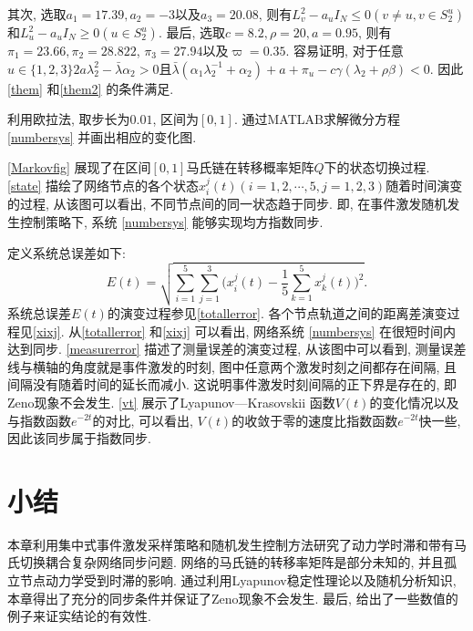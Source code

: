  其次, 选取$a_1=17.39, a_2=-3$以及$a_3=20.08$, 则有$L^2_v-a_uI_N\leq 0(v\neq u, v\in S_2^u)$和$L^2_u-a_uI_N\geq 0(u\in S_2^u)$.
 最后, 选取$c=8.2, \rho=20, a=0.95$, 则有$\pi_1=23.66, \pi_2=28.822$, $\pi_3=27.94$以及$\varpi=0.35$. 容易证明, 对于任意$u\in\{1,2,3\}$$2a\lambda_2^2-\bar{\lambda}\alpha_2>0$且$\bar{\lambda}(\alpha_1\lambda^{-1}_2+\alpha_2)+a+\pi_u-c\gamma(\lambda_2+\rho\beta)<0$. 因此\autoref{them} 和\autoref{them2} 的条件满足.

 利用欧拉法, 取步长为$0.01$, 区间为$[0,1]$. 通过MATLAB求解微分方程 \eqref{numbersys} 并画出相应的变化图.

\autoref{Markovfig} 展现了在区间$[0,1]$马氏链在转移概率矩阵$Q$下的状态切换过程. \autoref{state} 描绘了网络节点的各个状态$x_i^j(t)(i=1,2,\cdots,5, j=1,2,3)$随着时间演变的过程, 从该图可以看出, 不同节点间的同一状态趋于同步. 即, 在事件激发随机发生控制策略下, 系统 \eqref{numbersys} 能够实现均方指数同步.

定义系统总误差如下:
        $$E(t)=\sqrt{\sum_{i=1}^5\sum_{j=1}^3\Big(x_i^j(t)-\frac{1}{5}\sum_{k=1}^5x_k^j(t)\Big)^2}.$$
系统总误差$E(t)$的演变过程参见\autoref{totallerror}. 各个节点轨道之间的距离差演变过程见\autoref{xixj}. 从\autoref{totallerror} 和\autoref{xixj} 可以看出, 网络系统 \eqref{numbersys} 在很短时间内达到同步. \autoref{measurerror} 描述了测量误差的演变过程, 从该图中可以看到, 测量误差线与横轴的角度就是事件激发的时刻, 图中任意两个激发时刻之间都存在间隔, 且间隔没有随着时间的延长而减小. 这说明事件激发时刻间隔的正下界是存在的, 即Zeno现象不会发生. \autoref{vt} 展示了Lyapunov—Krasovskii 函数$V (t)$的变化情况以及与指数函数$e^{-2t}$的对比, 可以看出, $V (t)$的收敛于零的速度比指数函数$e^{-2t}$快一些, 因此该同步属于指数同步.

\section{小结}\label{con}
     本章利用集中式事件激发采样策略和随机发生控制方法研究了动力学时滞和带有马氏切换耦合复杂网络同步问题. 网络的马氏链的转移率矩阵是部分未知的, 并且孤立节点动力学受到时滞的影响. 通过利用Lyapunov稳定性理论以及随机分析知识, 本章得出了充分的同步条件并保证了Zeno现象不会发生. 最后, 给出了一些数值的例子来证实结论的有效性.
